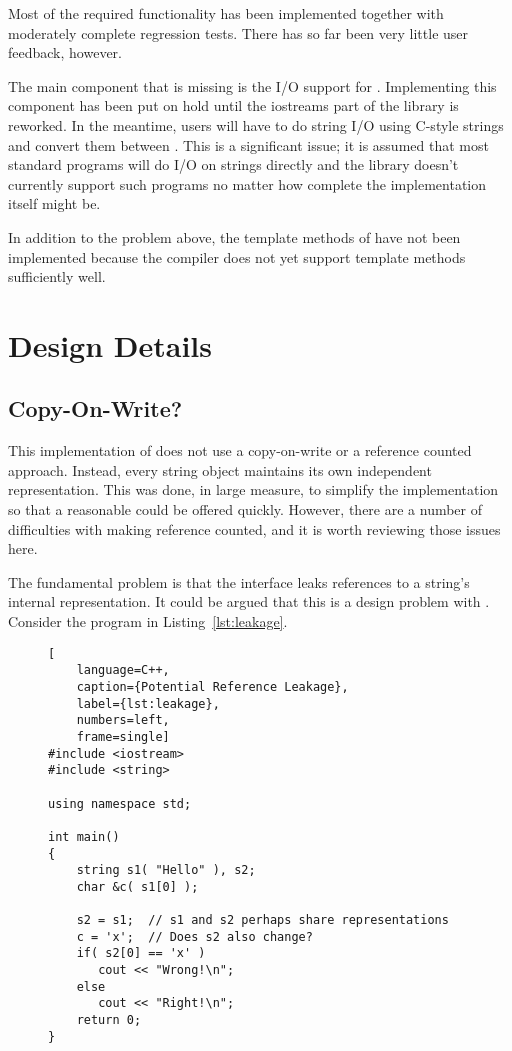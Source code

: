 Most of the required functionality has been implemented together with moderately
complete regression tests. There has so far been very little user feedback,
however.

The main component that is missing is the I/O support for .
Implementing this component has been put on hold until the iostreams part of
the library is reworked. In the meantime, users will have to do string I/O
using C-style strings and convert them between . This is a
significant issue; it is assumed that most standard programs will do I/O on
strings directly and the library doesn't currently support such programs no
matter how complete the  implementation itself might be.

In addition to the problem above, the template methods of 
have not been implemented because the compiler does not yet support template
methods sufficiently well.

\section{Design Details}

\subsection{Copy-On-Write?}

This implementation of  does not use a copy-on-write or a
reference counted approach. Instead, every string object maintains its own
independent representation. This was done, in large measure, to simplify the
implementation so that a reasonable  could be offered
quickly. However, there are a number of difficulties with making
 reference counted, and it is worth reviewing those issues
here.

The fundamental problem is that the  interface leaks
references to a string's internal representation. It could be argued that this
is a design problem with . Consider the program in
Listing~\ref{lst:leakage}.

\begin{figure}[htbp]
\centering
\begin{lstlisting}[
    language=C++,
    caption={Potential Reference Leakage},
    label={lst:leakage},
    numbers=left,
    frame=single]
#include <iostream>
#include <string>

using namespace std;

int main()
{
    string s1( "Hello" ), s2;
    char &c( s1[0] );

    s2 = s1;  // s1 and s2 perhaps share representations
    c = 'x';  // Does s2 also change?
    if( s2[0] == 'x' )
       cout << "Wrong!\n";
    else
       cout << "Right!\n";
    return 0;
}
\end{lstlisting}
\end{figure}


